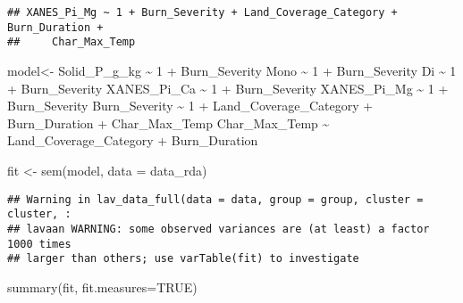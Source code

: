 \documentclass[
]{article}
\newenvironment{Shaded}{\begin{snugshade}}{\end{snugshade}}
\newcommand{\AttributeTok}[1]{\textcolor[rgb]{0.77,0.63,0.00}{#1}}
\newcommand{\ConstantTok}[1]{\textcolor[rgb]{0.00,0.00,0.00}{#1}}
\newcommand{\FunctionTok}[1]{\textcolor[rgb]{0.00,0.00,0.00}{#1}}
\newcommand{\NormalTok}[1]{#1}
\newcommand{\OtherTok}[1]{\textcolor[rgb]{0.56,0.35,0.01}{#1}}
\newcommand{\StringTok}[1]{\textcolor[rgb]{0.31,0.60,0.02}{#1}}
\begin{document}
\begin{verbatim}
## XANES_Pi_Mg ~ 1 + Burn_Severity + Land_Coverage_Category + Burn_Duration + 
##     Char_Max_Temp
\end{verbatim}

\begin{Shaded}
\begin{Highlighting}[]
\NormalTok{model}\OtherTok{\textless{}{-}}\StringTok{\textquotesingle{}}
\StringTok{Solid\_P\_g\_kg \textasciitilde{} 1 + Burn\_Severity}
\StringTok{Mono \textasciitilde{} 1 + Burn\_Severity}
\StringTok{Di \textasciitilde{} 1 + Burn\_Severity}
\StringTok{XANES\_Pi\_Ca \textasciitilde{} 1 + Burn\_Severity}
\StringTok{XANES\_Pi\_Mg \textasciitilde{} 1 + Burn\_Severity }
\StringTok{Burn\_Severity \textasciitilde{} 1 + Land\_Coverage\_Category + Burn\_Duration + Char\_Max\_Temp}
\StringTok{Char\_Max\_Temp \textasciitilde{} Land\_Coverage\_Category + Burn\_Duration}
\StringTok{\textquotesingle{}}

\NormalTok{fit }\OtherTok{\textless{}{-}} \FunctionTok{sem}\NormalTok{(model, }\AttributeTok{data =}\NormalTok{ data\_rda)}
\end{Highlighting}
\end{Shaded}

\begin{verbatim}
## Warning in lav_data_full(data = data, group = group, cluster = cluster, :
## lavaan WARNING: some observed variances are (at least) a factor 1000 times
## larger than others; use varTable(fit) to investigate
\end{verbatim}

\begin{Shaded}
\begin{Highlighting}[]
\FunctionTok{summary}\NormalTok{(fit, }\AttributeTok{fit.measures=}\ConstantTok{TRUE}\NormalTok{)}
\end{Highlighting}
\end{Shaded}
\end{document}
